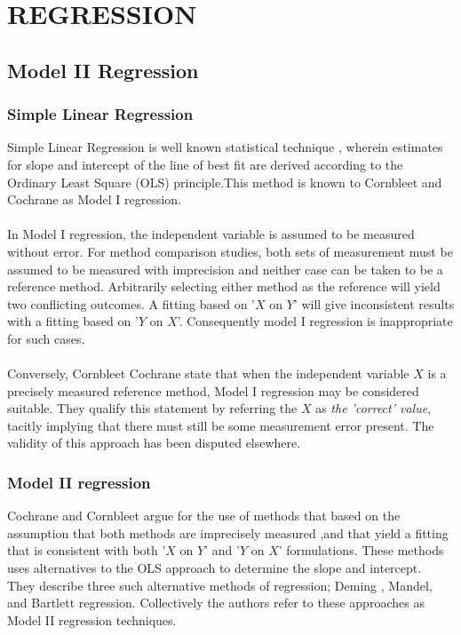 \chapter{REGRESSION}%
\section{Model II Regression}
\subsection{Simple Linear Regression} Simple Linear Regression is  well
known statistical technique , wherein estimates for slope and
intercept of the line of best fit are derived according to the
Ordinary Least Square (OLS) principle.This method is known to
Cornbleet and Cochrane as Model I regression.
\\
\\
In Model I regression, the independent variable is assumed to be
measured without error. For method comparison studies, both sets
of measurement must be assumed to be measured with imprecision and
neither case can be taken to be a reference method. Arbitrarily
selecting either method as the reference will yield two
conflicting outcomes. A fitting based on '$X$ on $Y$' will give
inconsistent results with a fitting based on '$Y$ on $X$'.
Consequently model I regression is inappropriate for such cases.
\\
\\
Conversely, Cornbleet Cochrane state that when the independent
variable $X$ is a precisely measured reference method, Model I
regression may be considered suitable. They qualify this statement
by referring the $X$ as \emph{the 'correct' value}, tacitly
implying that there must still be some measurement error present.
The validity of this approach has been disputed elsewhere.




\subsection{Model II regression}
Cochrane and Cornbleet argue for the use of methods that based on
the assumption that both methods are imprecisely measured ,and
that yield a fitting that is consistent with both '$X$ on $Y$' and
'$Y$ on $X$' formulations. These methods uses alternatives to the
OLS approach to determine the slope and intercept.
\\
They describe three such alternative methods of regression; Deming
, Mandel, and Bartlett regression. Collectively the authors refer
to these approaches as Model II regression techniques.

